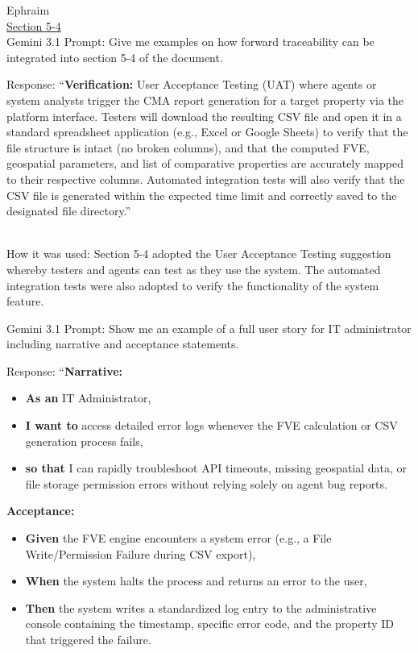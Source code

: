 \documentclass[
]{article}
\begin{document}
Ephraim\\
\ul{Section 5-4}\\
Gemini 3.1 Prompt: Give me examples on how forward traceability can be
integrated into section 5-4 of the document.

Response: ``\textbf{Verification:} User Acceptance Testing (UAT) where
agents or system analysts trigger the CMA report generation for a target
property via the platform interface. Testers will download the resulting
CSV file and open it in a standard spreadsheet application (e.g., Excel
or Google Sheets) to verify that the file structure is intact (no broken
columns), and that the computed FVE, geospatial parameters, and list of
comparative properties are accurately mapped to their respective
columns. Automated integration tests will also verify that the CSV file
is generated within the expected time limit and correctly saved to the
designated file directory.''\\
\strut \\
How it was used: Section 5-4 adopted the User Acceptance Testing
suggestion whereby testers and agents can test as they use the system.
The automated integration tests were also adopted to verify the
functionality of the system feature.

Gemini 3.1 Prompt: Show me an example of a full user story for IT
administrator including narrative and acceptance statements.

Response: ``\textbf{Narrative:}

\begin{itemize}
\item
  \textbf{As an} IT Administrator,
\item
  \textbf{I want to} access detailed error logs whenever the FVE
  calculation or CSV generation process fails,
\item
  \textbf{so that} I can rapidly troubleshoot API timeouts, missing
  geospatial data, or file storage permission errors without relying
  solely on agent bug reports.
\end{itemize}

\textbf{Acceptance:}

\begin{itemize}
\item
  \textbf{Given} the FVE engine encounters a system error (e.g., a File
  Write/Permission Failure during CSV export),
\item
  \textbf{When} the system halts the process and returns an error to the
  user,
\item
  \textbf{Then} the system writes a standardized log entry to the
  administrative console containing the timestamp, specific error code,
  and the property ID that triggered the failure.
\end{itemize}
\end{document}
